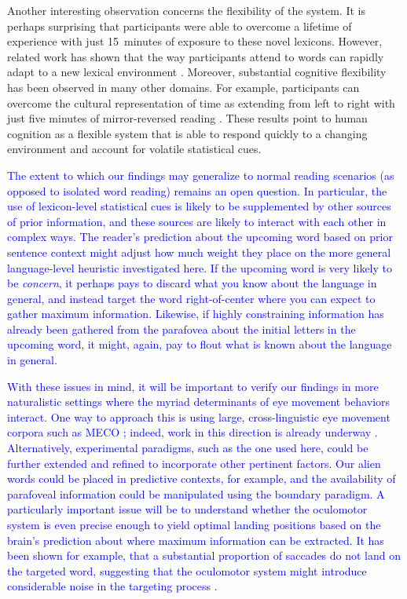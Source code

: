 \documentclass[doc,biblatex]{apa7}
\newcommand\newmaterial[1]{\textcolor{blue}{#1}}
\begin{document}
Another interesting observation concerns the flexibility of the system. It is perhaps surprising that participants were able to overcome a lifetime of experience with just 15~minutes of exposure to these novel lexicons. However, related work has shown that the way participants attend to words can rapidly adapt to a new lexical environment \parencite{Ducrot:2002}. Moreover, substantial cognitive flexibility has been observed in many other domains. For example, participants can overcome the cultural representation of time as extending from left to right with just five minutes of mirror-reversed reading \parencite{Casasanto:2014}. These results point to human cognition as a flexible system that is able to respond quickly to a changing environment and account for volatile statistical cues.

\newmaterial{The extent to which our findings may generalize to normal reading scenarios (as opposed to isolated word reading) remains an open question. In particular, the use of lexicon-level statistical cues is likely to be supplemented by other sources of prior information, and these sources are likely to interact with each other in complex ways. The reader's prediction about the upcoming word based on prior sentence context might adjust how much weight they place on the more general language-level heuristic investigated here. If the upcoming word is very likely to be \textit{concern}, it perhaps pays to discard what you know about the language in general, and instead target the word right-of-center where you can expect to gather maximum information. Likewise, if highly constraining information has already been gathered from the parafovea about the initial letters in the upcoming word, it might, again, pay to flout what is known about the language in general.}

\newmaterial{With these issues in mind, it will be important to verify our findings in more naturalistic settings where the myriad determinants of eye movement behaviors interact. One way to approach this is using large, cross-linguistic eye movement corpora such as MECO \parencite{Siegelman:2022}; indeed, work in this direction is already underway \parencite{Shafir:2022}. Alternatively, experimental paradigms, such as the one used here, could be further extended and refined to incorporate other pertinent factors. Our alien words could be placed in predictive contexts, for example, and the availability of parafoveal information could be manipulated using the boundary paradigm. A particularly important issue will be to understand whether the oculomotor system is even precise enough to yield optimal landing positions based on the brain's prediction about where maximum information can be extracted. It has been shown for example, that a substantial proportion of saccades do not land on the targeted word, suggesting that the oculomotor system might introduce considerable noise in the targeting process \parencite{Engbert:2008}.}
\end{document}
